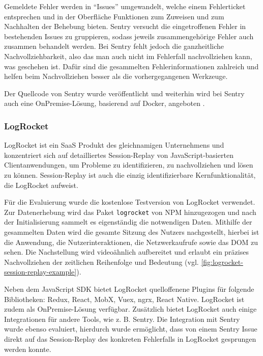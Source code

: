 Gemeldete Fehler werden in \enquote{Issues} umgewandelt, welche einem Fehlerticket entsprechen und in der Oberfläche Funktionen zum Zuweisen und zum Nachhalten der Behebung bieten. Sentry versucht die eingetroffenen Fehler in bestehenden Issues zu gruppieren, sodass jeweils zusammengehörige Fehler auch zusammen behandelt werden. Bei Sentry fehlt jedoch die ganzheitliche Nachvollziehbarkeit, also das man auch nicht im Fehlerfall nachvollziehen kann, was geschehen ist. Dafür sind die gesammelten Fehlerinformationen zahlreich und helfen beim Nachvollziehen besser als die vorhergegangenen Werkzeuge.

Der Quellcode von Sentry wurde veröffentlicht und weiterhin wird bei Sentry auch eine OnPremise-Lösung, basierend auf Docker, angeboten \cite{SentrySelfHosted}.

\subsubsection{LogRocket}

LogRocket \cite{LogRocket} ist ein SaaS Produkt des gleichnamigen Unternehmens und konzentriert sich auf detailliertes Session-Replay von JavaScript-basierten Clientanwendungen, um Probleme zu identifizieren, zu nachvollziehen und lösen zu können. Session-Replay ist auch die einzig identifizierbare Kernfunktionalität, die LogRocket aufweist.

Für die Evaluierung wurde die kostenlose Testversion von LogRocket verwendet. Zur Datenerhebung wird das Paket \texttt{logrocket} von NPM hinzugezogen und nach der Initialisierung sammelt es eigenständig die notwendigen Daten. Mithilfe der gesammelten Daten wird die gesamte Sitzung des Nutzers nachgestellt, hierbei ist die Anwendung, die Nutzerinteraktionen, die Netzwerkaufrufe sowie das DOM zu sehen. Die Nachstellung wird videoähnlich aufbereitet und erlaubt ein präzises Nachvollziehen der zeitlichen Reihenfolge und Bedeutung (vgl. \autoref{fig:logrocket-session-replay-example}).

Neben dem JavaScript SDK bietet LogRocket quelloffenene Plugins für folgende Bibliotheken: Redux, React, MobX, Vuex, ngrx, React Native. LogRocket ist zudem als OnPremise-Lösung verfügbar. Zusätzlich bietet LogRocket auch einige Integrationen für andere Tools, wie z. B. Sentry. Die Integration mit Sentry wurde ebenso evaluiert, hierdurch wurde ermöglicht, dass von einem Sentry Issue direkt auf das Session-Replay des konkreten Fehlerfalls in LogRocket gesprungen werden konnte.

